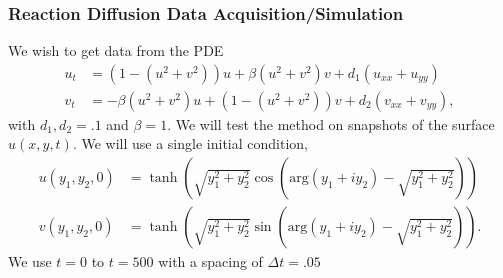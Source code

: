 \documentclass[12pt]{article}
\begin{document}
\subsubsection{Reaction Diffusion Data Acquisition/Simulation}
We wish to get data from the PDE
\begin{align*}
    u_t &= \left(1-(u^2+v^2) \right)u + \beta(u^2+v^2)v + d_1(u_{xx}+u_{yy})\\
    v_t &= -\beta(u^2+v^2)u + \left(1-(u^2+v^2)\right)v + d_2(v_{xx}+v_{yy}),
\end{align*}
with $d_1,d_2=.1$ and $\beta = 1$.
We will test the method on snapshots of the surface $u(x,y,t)$.
We will use a single initial condition,
\begin{align*}
    u(y_1,y_2,0)&= \tanh\left(\sqrt{y_1^2+y_2^2}\cos\left(\text{arg}(y_1+iy_2)-\sqrt{y_1^2+y_2^2}\right)\right)\\
    v(y_1,y_2,0) &= \tanh\left(\sqrt{y_1^2+y_2^2}\sin\left(\text{arg}(y_1+iy_2)-\sqrt{y_1^2+y_2^2}\right)\right).
\end{align*}
We use $t=0$ to $t=500$ with a spacing of $\Delta t = .05$
\end{document}
